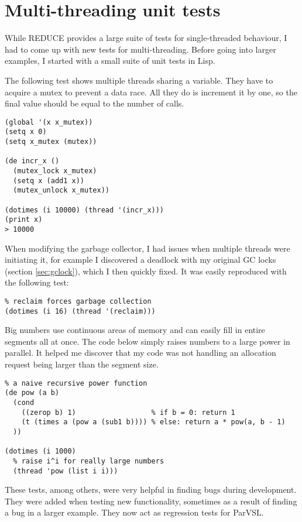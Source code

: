 \section{Multi-threading unit tests}

While REDUCE provides a large suite of tests for single-threaded behaviour, I had to come
up with new tests for multi-threading. Before going into larger examples, I started with a small
suite of unit tests in Lisp.

The following test shows multiple threads sharing a variable. They have to acquire
a mutex to prevent a data race. All they do is increment it by one, so the final
value should be equal to the number of calls.

\label{lst:shared-global}
\begin{verbatim}
(global '(x x_mutex))
(setq x 0)
(setq x_mutex (mutex))

(de incr_x ()
  (mutex_lock x_mutex)
  (setq x (add1 x))
  (mutex_unlock x_mutex))

(dotimes (i 10000) (thread '(incr_x)))
(print x)
> 10000
\end{verbatim}

When modifying the garbage collector, I had issues when multiple
threads were initiating it, for example I discovered a deadlock
with my original GC locks (section \ref{sec:gclock}), which I then
quickly fixed. It was easily reproduced with the following test:

\begin{verbatim}
% reclaim forces garbage collection
(dotimes (i 16) (thread '(reclaim)))
\end{verbatim}

Big numbers use continuous areas of memory and can easily
fill in entire segments all at once. The code below simply
raises numbers to a large power in parallel. It helped me discover
that my code was not handling an allocation request being
larger than the segment size.


\begin{verbatim}
% a naive recursive power function
(de pow (a b)
  (cond
    ((zerop b) 1)                  % if b = 0: return 1
    (t (times a (pow a (sub1 b)))) % else: return a * pow(a, b - 1)
  ))

(dotimes (i 1000)
  % raise i^i for really large numbers
  (thread 'pow (list i i)))
\end{verbatim}

These tests, among others, were very helpful in finding bugs
during development. They were added when testing new functionality,
sometimes as a result of finding a bug in a larger example.
They now act as regression tests for ParVSL.

